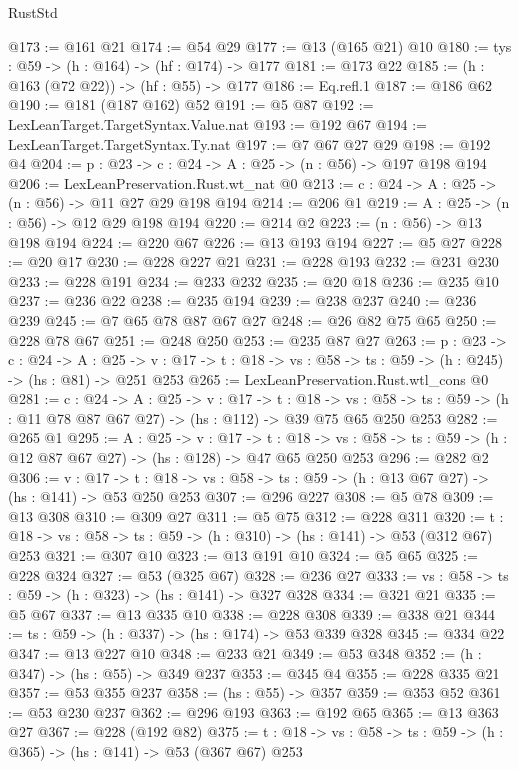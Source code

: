 \begin{lexlean}{RustStd}
\begin{coremodule}
@173 := @161 @21
@174 := @54 @29
@177 := @13 (@165 @21) @10
@180 := {tys : @59} -> (h : @164) -> (hf : @174) -> @177
@181 := @173 @22
@185 := (h : @163 (@72 @22)) -> (hf : @55) -> @177
@186 := Eq.refl.{1}
@187 := @186 @62
@190 := @181 (@187 @162) @52
@191 := @5 @87
@192 := LexLeanTarget.TargetSyntax.Value.nat
@193 := @192 @67
@194 := LexLeanTarget.TargetSyntax.Ty.nat
@197 := @7 @67 @27 @29
@198 := @192 @4
@204 := {p : @23} -> {c : @24} -> {A : @25} -> (n : @56) -> @197 @198 @194
@206 := LexLeanPreservation.Rust.wt_nat @0
@213 := {c : @24} -> {A : @25} -> (n : @56) -> @11 @27 @29 @198 @194
@214 := @206 @1
@219 := {A : @25} -> (n : @56) -> @12 @29 @198 @194
@220 := @214 @2
@223 := (n : @56) -> @13 @198 @194
@224 := @220 @67
@226 := @13 @193 @194
@227 := @5 @27
@228 := @20 @17
@230 := @228 @227 @21
@231 := @228 @193
@232 := @231 @230
@233 := @228 @191
@234 := @233 @232
@235 := @20 @18
@236 := @235 @10
@237 := @236 @22
@238 := @235 @194
@239 := @238 @237
@240 := @236 @239
@245 := @7 @65 @78 @87 @67 @27
@248 := @26 @82 @75 @65
@250 := @228 @78 @67
@251 := @248 @250
@253 := @235 @87 @27
@263 := {p : @23} ->
  {c : @24} ->
  {A : @25} ->
  {v : @17} -> {t : @18} -> {vs : @58} -> {ts : @59} -> (h : @245) -> (hs : @81) -> @251 @253
@265 := LexLeanPreservation.Rust.wtl_cons @0
@281 := {c : @24} ->
  {A : @25} ->
  {v : @17} ->
  {t : @18} ->
  {vs : @58} -> {ts : @59} -> (h : @11 @78 @87 @67 @27) -> (hs : @112) -> @39 @75 @65 @250 @253
@282 := @265 @1
@295 := {A : @25} ->
  {v : @17} ->
  {t : @18} -> {vs : @58} -> {ts : @59} -> (h : @12 @87 @67 @27) -> (hs : @128) -> @47 @65 @250 @253
@296 := @282 @2
@306 := {v : @17} ->
  {t : @18} -> {vs : @58} -> {ts : @59} -> (h : @13 @67 @27) -> (hs : @141) -> @53 @250 @253
@307 := @296 @227
@308 := @5 @78
@309 := @13 @308
@310 := @309 @27
@311 := @5 @75
@312 := @228 @311
@320 := {t : @18} -> {vs : @58} -> {ts : @59} -> (h : @310) -> (hs : @141) -> @53 (@312 @67) @253
@321 := @307 @10
@323 := @13 @191 @10
@324 := @5 @65
@325 := @228 @324
@327 := @53 (@325 @67)
@328 := @236 @27
@333 := {vs : @58} -> {ts : @59} -> (h : @323) -> (hs : @141) -> @327 @328
@334 := @321 @21
@335 := @5 @67
@337 := @13 @335 @10
@338 := @228 @308
@339 := @338 @21
@344 := {ts : @59} -> (h : @337) -> (hs : @174) -> @53 @339 @328
@345 := @334 @22
@347 := @13 @227 @10
@348 := @233 @21
@349 := @53 @348
@352 := (h : @347) -> (hs : @55) -> @349 @237
@353 := @345 @4
@355 := @228 @335 @21
@357 := @53 @355 @237
@358 := (hs : @55) -> @357
@359 := @353 @52
@361 := @53 @230 @237
@362 := @296 @193
@363 := @192 @65
@365 := @13 @363 @27
@367 := @228 (@192 @82)
@375 := {t : @18} -> {vs : @58} -> {ts : @59} -> (h : @365) -> (hs : @141) -> @53 (@367 @67) @253

\end{coremodule}
\end{lexlean}
